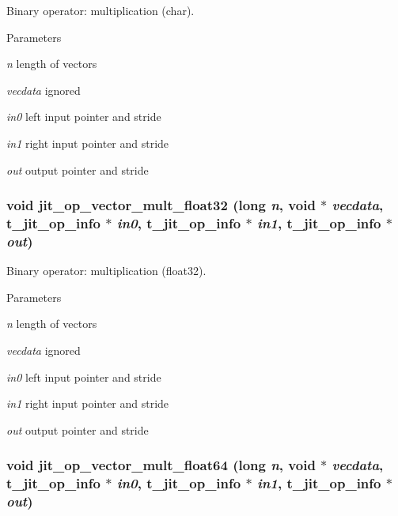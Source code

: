 Binary operator: multiplication (char). 
\begin{DoxyParams}{Parameters}
\item[{\em n}]length of vectors \item[{\em vecdata}]ignored \item[{\em in0}]left input pointer and stride \item[{\em in1}]right input pointer and stride \item[{\em out}]output pointer and stride \end{DoxyParams}
\hypertarget{group__opvecmod_gad0a57e536071468ec58cf85c95ece970}{
\subsubsection[{jit\_\-op\_\-vector\_\-mult\_\-float32}]{\setlength{\rightskip}{0pt plus 5cm}void jit\_\-op\_\-vector\_\-mult\_\-float32 (long {\em n}, \/  void $\ast$ {\em vecdata}, \/  {\bf t\_\-jit\_\-op\_\-info} $\ast$ {\em in0}, \/  {\bf t\_\-jit\_\-op\_\-info} $\ast$ {\em in1}, \/  {\bf t\_\-jit\_\-op\_\-info} $\ast$ {\em out})}}
\label{group__opvecmod_gad0a57e536071468ec58cf85c95ece970}


Binary operator: multiplication (float32). 
\begin{DoxyParams}{Parameters}
\item[{\em n}]length of vectors \item[{\em vecdata}]ignored \item[{\em in0}]left input pointer and stride \item[{\em in1}]right input pointer and stride \item[{\em out}]output pointer and stride \end{DoxyParams}
\hypertarget{group__opvecmod_ga6d9c3e715f7b275e11614dc58d2e9b4f}{
\subsubsection[{jit\_\-op\_\-vector\_\-mult\_\-float64}]{\setlength{\rightskip}{0pt plus 5cm}void jit\_\-op\_\-vector\_\-mult\_\-float64 (long {\em n}, \/  void $\ast$ {\em vecdata}, \/  {\bf t\_\-jit\_\-op\_\-info} $\ast$ {\em in0}, \/  {\bf t\_\-jit\_\-op\_\-info} $\ast$ {\em in1}, \/  {\bf t\_\-jit\_\-op\_\-info} $\ast$ {\em out})}}
\label{group__opvecmod_ga6d9c3e715f7b275e11614dc58d2e9b4f}


